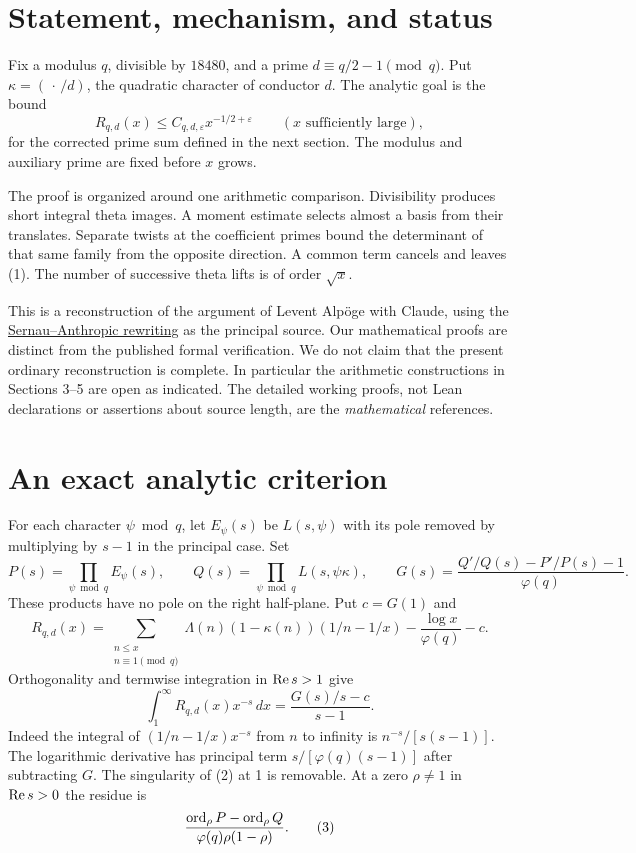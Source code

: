 \section{Statement, mechanism, and status}
Fix a modulus \(q\), divisible by \(18480\), and a prime
\(d\equiv q/2-1\pmod q\). Put \(\kappa=(\,\cdot\,/d)\), the quadratic
character of conductor \(d\). The analytic goal is the bound
\[
 R_{q,d}(x)\le C_{q,d,\varepsilon}x^{-1/2+\varepsilon}
 \qquad (x\text{ sufficiently large}),
 \tag{1}
\]
for the corrected prime sum defined in the next section. The modulus
and auxiliary prime are fixed before \(x\) grows.

The proof is organized around one arithmetic comparison. Divisibility
produces short integral theta images. A moment estimate selects almost
a basis from their translates. Separate twists at the coefficient
primes bound the determinant of that same family from the opposite
direction. A common term cancels and leaves (1). The number of
successive theta lifts is of order \(\sqrt{x}\).

This is a reconstruction of the argument of Levent Alp\"oge with Claude,
using the \href{\sourcepin}{Sernau--Anthropic rewriting} as the principal
source. Our mathematical proofs are distinct from the published formal
verification. We do not claim that the present ordinary reconstruction
is complete. In particular the arithmetic constructions in Sections 3--5
are open as indicated. The detailed working proofs, not Lean declarations
or assertions about source length, are the \emph{mathematical} references.

\section{An exact analytic criterion}
For each character \(\psi\bmod q\), let \(E_\psi(s)\) be \(L(s,\psi)\)
with its pole removed by multiplying by \(s-1\) in the principal case.
Set
\[
 P(s)=\prod_{\psi\bmod q}E_\psi(s),\qquad
 Q(s)=\prod_{\psi\bmod q}L(s,\psi\kappa),\qquad
 G(s)=\frac{Q'/Q(s)-P'/P(s)-1}{\varphi(q)}.
\]
These products have no pole on the right half-plane. Put \(c=G(1)\)
and
\[
 R_{q,d}(x)=\sum_{\substack{n\le x\\n\equiv1\pmod q}}
 \Lambda(n)(1-\kappa(n))(1/n-1/x)
 -\frac{\log x}{\varphi(q)}-c.
\]
Orthogonality and termwise integration in \(\operatorname{Re} s>1\) give
\[
 \int_1^\infty R_{q,d}(x)x^{-s}\,dx
 =\frac{G(s)/s-c}{s-1}.
 \tag{2}
\]
Indeed the integral of \((1/n-1/x)x^{-s}\) from \(n\) to infinity
is \(n^{-s}/[s(s-1)]\). The logarithmic derivative has principal
term \(s/[\varphi(q)(s-1)]\) after subtracting \(G\).
The singularity of (2) at 1 is removable. At a zero \(\rho\ne1\)
in \(\operatorname{Re} s>0\) the residue is
\[
 \frac{\operatorname{ord}_\rho P-\operatorname{ord}_\rho Q}{\varphi(q)\rho(1-\rho)}.
 \tag{3}
\]

